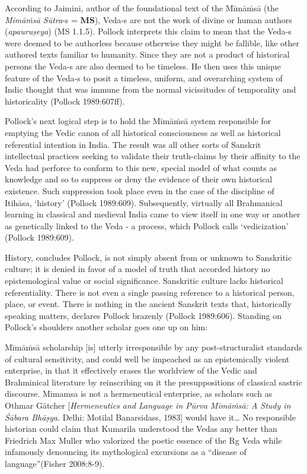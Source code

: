 According to Jaimini, author of the foundational text of the Mīmāṁsā (the \textit{Mīmāṁsā Sūtra}-s = \textbf{MS}), Veda-s are not the work of divine or human authors (\textit{apauruṣeya}) (MS 1.1.5). Pollock interprets this claim to mean that the Veda-s were deemed to be authorless because otherwise they might be fallible, like other authored texts familiar to humanity. Since they are not a product of historical persons the Veda-s are also deemed to be timeless. He then uses this unique feature of the Veda-s to posit a timeless, uniform, and overarching system of Indic thought that was immune from the normal vicissitudes of temporality and historicality (Pollock 1989:607ff). 

Pollock’s next logical step is to hold the Mīmāṁsā system responsible for emptying the Vedic canon of all historical consciousness as well as historical referential intention in India. The result was all other sorts of Sanskrit intellectual practices seeking to validate their truth-claims by their affinity to the Veda had perforce to conform to this new, special model of what counts as knowledge and so to suppress or deny the evidence of their own historical existence. Such suppression took place even in the case of the discipline of Itihāsa, ‘history’ (Pollock 1989:609). Subsequently, virtually all Brahmanical learning in classical and medieval India came to view itself in one way or another as genetically linked to the Veda - a process, which Pollock calls ‘vedicization’ (Pollock 1989:609).

History, concludes Pollock, is not simply absent from or unknown to Sanskritic culture; it is denied in favor of a model of truth that accorded history no epistemological value or social significance. Sanskritic culture lacks historical referentiality. There is not even a single passing reference to a historical person, place, or event. There is nothing in the ancient Sanskrit texts that, historically speaking matters, declares Pollock brazenly (Pollock 1989:606). Standing on Pollock’s shoulders another scholar goes one up on him:

\begin{myquote}
Mīmāṁsā scholarship [is] utterly irresponsible by any post-structuralist standards of cultural sensitivity, and could well be impeached as an epistemically violent enterprise, in that it effectively erases the worldview of the Vedic and Brahminical literature by reinscribing on it the presuppositions of classical sastric discourse. Mimamsa is not a hermeneutical enterprise, as scholars such as Othmar Gätcher [\textit{Hermeneutics and Language in Pūrva Mīmāṁsā: A Study in Śābara Bhāṣya}. Delhi: Motilal Banarsidass, 1983] would have it… No responsible historian could claim that Kumarila understood the Vedas any better than Friedrich Max Muller who valorized the poetic essence of the Rg Veda while infamously denouncing its mythological excursions as a “disease of language”\hfill (Fisher 2008:8-9).
\end{myquote}


